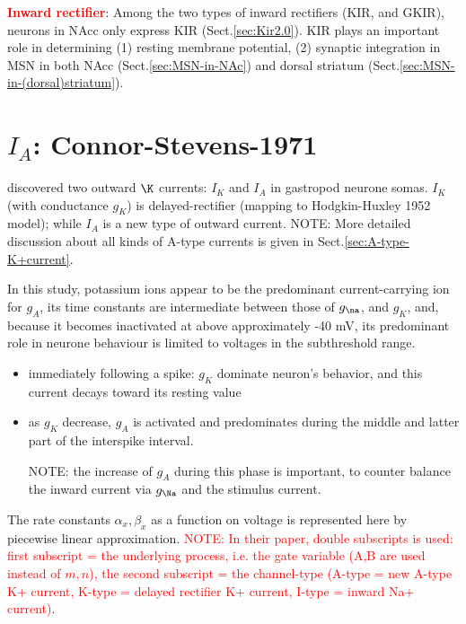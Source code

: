 \textcolor{red}{\bf Inward rectifier}: Among the two types of inward rectifiers
(KIR, and GKIR), neurons in NAcc only express KIR (Sect.\ref{sec:Kir2.0}). KIR
plays an important role in determining (1) resting membrane potential, (2)
synaptic integration in MSN in both NAcc (Sect.\ref{sec:MSN-in-NAc}) and dorsal
striatum (Sect.\ref{sec:MSN-in-(dorsal)striatum}).

\section{$I_A$: Connor-Stevens-1971}
\label{sec:A-type-K+current-Connor-Stevens-1971}

\citep{connor1971prf} discovered two outward $\K$ currents: $I_K$ and $I_A$ in
gastropod neurone somas. $I_K$ (with conductance $g_K$) is delayed-rectifier
(mapping to Hodgkin-Huxley 1952 model); while $I_A$ is a new type of outward
current. NOTE: More detailed discussion about all kinds of A-type currents is
given in Sect.\ref{sec:A-type-K+current}.

In this study, potassium ions appear to be the predominant current-carrying ion
for $g_A$, its time constants are intermediate between those of $g_\na$, and
$g_K$, and, because it becomes inactivated at above approximately -40 mV, its
predominant role in neurone behaviour is limited to voltages in the subthreshold
range. 
\begin{itemize}
  \item immediately following a spike: $g_K$ dominate neuron's behavior, and
  this current decays toward its resting value
  \item as $g_K$ decrease, $g_A$ is activated and predominates during the middle
  and latter part of the interspike interval.
  
NOTE: the increase of $g_A$ during this phase is important, to counter balance
the inward current via $g_\Na$ and the stimulus current.
\end{itemize}

The rate constants $\alpha_x, \beta_x$ as a function on voltage is represented
here by piecewise linear approximation. \textcolor{red}{NOTE: In their paper,
double subscripts is used: first subscript = the underlying process, i.e. the
gate variable (A,B are used instead of $m,n$), the second subscript = the
channel-type (A-type = new A-type K+ current, K-type = delayed rectifier K+
current, I-type = inward Na+ current)}.







